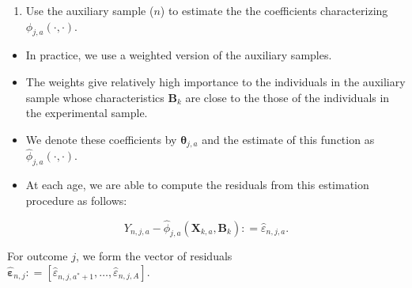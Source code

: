 \documentclass[static]{JJH-Beamer}
\begin{document}
\begin{frame}

\begin{enumerate}[1.]
\item Use the auxiliary sample ($n$) to estimate the the coefficients characterizing $\phi_{j,a} \left( \cdot , \cdot \right)$.
\end{enumerate}
    \begin{itemize}
    \item In practice, we use a weighted version of the auxiliary samples.
    \item The weights give relatively high importance to the individuals in the auxiliary sample whose characteristics $\bm{B}_k$ are close to the those of the individuals in the experimental sample.
    \item We denote these coefficients by $\bm{\theta}_{j,a}$ and the estimate of this function as $\hat{\phi}_{j,a} \left( \cdot , \cdot \right)$.
    \item At each age, we are able to compute the residuals from this estimation procedure as follows:
\end{itemize}
\end{frame}

\begin{frame}

\begin{equation}
Y_{n,j,a} -  \hat{\phi}_{j,a} (\bm{X}_{k,a}, \bm{B}_k) : = \hat{\varepsilon}_{n,j,a}.
\end{equation}

\noindent For outcome $j$, we form the vector of residuals \\ $\hat{\bm{\varepsilon}}_{n,j} : = \left[ \hat{\varepsilon}_{n,j,a^*+1}, \ldots, \hat{\varepsilon}_{n,j,A} \right]$.

\end{frame}
\end{document}
